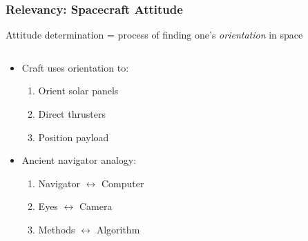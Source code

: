 \documentclass[11pt]{beamer}
\begin{document}
    \begin{frame}
        \frametitle{Relevancy: Spacecraft Attitude}
        \begin{definition}
            Attitude determination = process of finding one's \textit{orientation} in space
        \end{definition} \medskip
        \begin{columns}
            \begin{column}{0.5\textwidth}
                \begin{itemize}
                    \item Craft uses orientation to: \medskip
                    \begin{enumerate}
                        \item Orient solar panels
                        \item Direct thrusters
                        \item Position payload
                    \end{enumerate} \medskip
                    \item Ancient navigator analogy: \medskip
                    \begin{enumerate}
                        \item Navigator $\leftrightarrow$ Computer
                        \item Eyes $\leftrightarrow$ Camera
                        \item Methods $\leftrightarrow$ Algorithm
                    \end{enumerate}
                \end{itemize}
            \end{column}
            \begin{column}{0.5\textwidth}
            \end{column}
        \end{columns}
    \end{frame}
\end{document}

